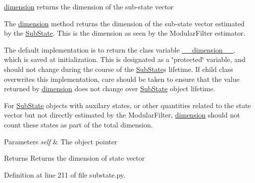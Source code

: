 \hyperlink{classmodest_1_1substates_1_1substate_1_1SubState_ab9027f6d1d7d57c47731612f519b7ee6}{dimension} returns the dimension of the sub-\/state vector 

The \hyperlink{classmodest_1_1substates_1_1substate_1_1SubState_ab9027f6d1d7d57c47731612f519b7ee6}{dimension} method returns the dimension of the sub-\/state vector estimated by the \hyperlink{classmodest_1_1substates_1_1substate_1_1SubState}{Sub\+State}. This is the dimension as seen by the Modular\+Filter estimator.

The default implementation is to return the class variable \hyperlink{classmodest_1_1substates_1_1substate_1_1SubState_a5b1c0756a69da7f293a415c7d2d77843}{\+\_\+\+\_\+dimension\+\_\+\+\_\+}, which is saved at initialization. This is designated as a \char`\"{}protected\char`\"{} variable, and should not change during the course of the \hyperlink{classmodest_1_1substates_1_1substate_1_1SubState}{Sub\+State}\textquotesingle{}s lifetime. If child class overwrites this implementation, care should be taken to ensure that the value returned by \hyperlink{classmodest_1_1substates_1_1substate_1_1SubState_ab9027f6d1d7d57c47731612f519b7ee6}{dimension} does not change over \hyperlink{classmodest_1_1substates_1_1substate_1_1SubState}{Sub\+State} object lifetime.

For \hyperlink{classmodest_1_1substates_1_1substate_1_1SubState}{Sub\+State} objects with auxilary states, or other quantities related to the state vector but not directly estimated by the Modular\+Filter, \hyperlink{classmodest_1_1substates_1_1substate_1_1SubState_ab9027f6d1d7d57c47731612f519b7ee6}{dimension} should not count these states as part of the total dimension.


\begin{DoxyParams}{Parameters}
{\em self} & The object pointer\\
\hline
\end{DoxyParams}
\begin{DoxyReturn}{Returns}
Returns the dimension of state vector 
\end{DoxyReturn}


Definition at line 211 of file substate.\+py.

